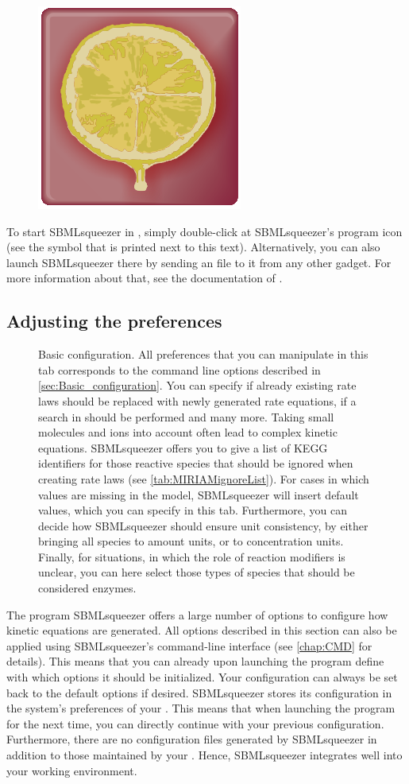 \begin{figure}
\includegraphics[width=.8cm]{img/LOGO}
\end{figure}
To start SBMLsqueezer in \Garuda, simply double-click at SBMLsqueezer's program icon (see the symbol that is printed next to this text).
Alternatively, you can also launch SBMLsqueezer there by sending an \SBML file to it from any other \Garuda gadget.
For more information about that, see the documentation of \Garuda.

\subsection{Adjusting the preferences}
\label{sec:GUIPrefs}
\begin{figure}
\caption[Basic configuration]{Basic configuration.
All preferences that you can manipulate in this
tab corresponds to the command line options described in
\vref{sec:Basic_configuration}. You can specify if already existing rate laws
should be replaced with newly generated rate equations, if a search in \SABIO
should be performed and many more.
Taking small molecules and ions into account often lead to complex kinetic equations.
SBMLsqueezer offers you to give a list of KEGG identifiers for those reactive
species that should be ignored when creating rate laws (see \vref{tab:MIRIAMignoreList}).
For cases in which values are missing in the
model, SBMLsqueezer will insert default values, which you can specify in this
tab. Furthermore, you can decide how SBMLsqueezer should ensure unit consistency,
by either bringing all species to amount units, or to concentration units.
Finally, for situations, in which the role of reaction modifiers is unclear, you
can here select those types of species that should be considered enzymes.}
\label{fig:Basic_Configuration}
\end{figure}
The program SBMLsqueezer offers a large number of options to configure how
kinetic equations are generated.
All options described in this section can also be applied using SBMLsqueezer's
command-line interface (see \vref{chap:CMD} for details).
This means that you can already upon launching the program define with which
options it should be initialized.
Your configuration can always be set back to the default options if desired.
SBMLsqueezer stores its configuration in the system's preferences of your \OS.
This means that when launching the program for the next time, you can directly
continue with your previous configuration.
Furthermore, there are no configuration files generated by SBMLsqueezer in
addition to those maintained by your \OS.
Hence, SBMLsqueezer integrates well into your working environment.

